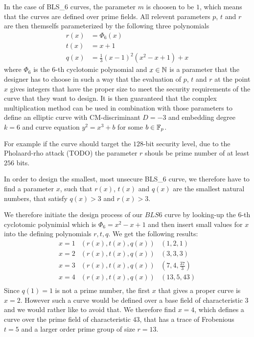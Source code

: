 In the case of BLS\_6 curves, the parameter $m$ is choosen to be $1$, which means that the curves are defined over prime fields. All relevent parameters $p$, $t$ and $r$ are then themselfs parameterized by the following three polynomials
\begin{align*}
r(x) &= \Phi_6(x)\\
t(x) &= x+1\\
q(x) &= \frac{1}{3}(x-1)^2(x^{2}-x+1) +x
\end{align*}
where $\Phi_6$ is the $6$-th cyclotomic polynomial and  $x\in\mathbb{N}$ is a parameter that the designer has to choose in such a way that the evaluation of $p$, $t$ and $r$ at the point $x$ gives integers that have the proper size to meet the security requirements of the curve that they want to design. It is then guaranteed that the complex multiplication method can be used in combination with those parameters to define an elliptic curve with CM-discriminant $D=-3$ and embedding degree $k=6$ and curve equation $y^2 = x^3 +b$ for some $b\in\mathbb{F}_p$. 

For example if the curve should target the $128$-bit security level, due to the Pholaard-rho attack (TODO) the parameter $r$ shouls be prime number of at least $256$ bits.

In order to design the smallest, most unsecure BLS\_6 curve, we therefore have to find a parameter $x$, such that $r(x)$, $t(x)$ and $q(x)$ are the smallest natural numbers, that satisfy $q(x)>3$ and $r(x)>3$.  

We therefore initiate the design process of our $BLS6$ curve by looking-up the $6$-th cyclotomic polynimial which is $\Phi_{6}=x^2-x+1$ and then insert small values for $x$ into the defining polynomials $r,t,q$. We get the following results:
$$
\begin{array}{lcr}
x=1 & (r(x),t(x),q(x)) & (1,2,1)\\
x=2 & (r(x),t(x),q(x)) & (3,3,3)\\
x=3 & (r(x),t(x),q(x)) & (7,4,\frac{37}{3})\\
x=4 & (r(x),t(x),q(x)) & (13,5,43)\\
\end{array}
$$
Since $q(1)=1$ is not a prime number, the first $x$ that gives a proper curve is $x=2$. However such a curve would be defined over a base field of characteristic $3$ and we would rather like to avoid that. We therefore find $x=4$, which defines a curve over the prime field of characteristic $43$, that has a trace of Frobenious $t=5$ and a larger order prime group of size $r=13$. 

